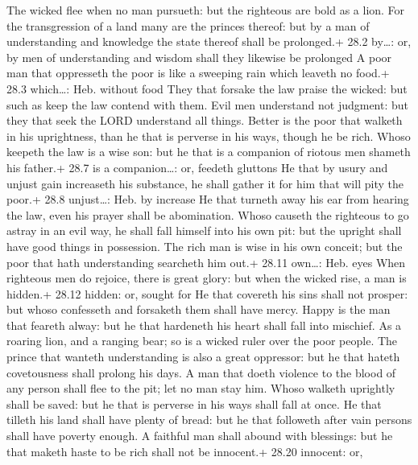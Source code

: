  The wicked flee when no man pursueth: but the righteous are
bold as a lion.  For the transgression of a land many are
the princes thereof: but by a man of understanding and knowledge the
state thereof shall be prolonged.+ 28.2 by\ldots: or, by men of
understanding and wisdom shall they likewise be prolonged  A
poor man that oppresseth the poor is like a sweeping rain which leaveth
no food.+ 28.3 which\ldots: Heb. without food  They that
forsake the law praise the wicked: but such as keep the law contend with
them.  Evil men understand not judgment: but they that seek
the LORD understand all things.  Better is the poor that
walketh in his uprightness, than he that is perverse in his ways, though
he be rich.  Whoso keepeth the law is a wise son: but he
that is a companion of riotous men shameth his father.+ 28.7 is a
companion\ldots: or, feedeth gluttons  He that by usury and
unjust gain increaseth his substance, he shall gather it for him that
will pity the poor.+ 28.8 unjust\ldots: Heb. by increase  He
that turneth away his ear from hearing the law, even his prayer shall be
abomination.  Whoso causeth the righteous to go astray in
an evil way, he shall fall himself into his own pit: but the upright
shall have good things in possession.  The rich man is wise
in his own conceit; but the poor that hath understanding searcheth him
out.+ 28.11 own\ldots: Heb. eyes  When righteous men do
rejoice, there is great glory: but when the wicked rise, a man is
hidden.+ 28.12 hidden: or, sought for  He that covereth his
sins shall not prosper: but whoso confesseth and forsaketh them shall
have mercy.  Happy is the man that feareth alway: but he
that hardeneth his heart shall fall into mischief.  As a
roaring lion, and a ranging bear; so is a wicked ruler over the poor
people.  The prince that wanteth understanding is also a
great oppressor: but he that hateth covetousness shall prolong his days.
 A man that doeth violence to the blood of any person shall
flee to the pit; let no man stay him.  Whoso walketh
uprightly shall be saved: but he that is perverse in his ways shall fall
at once.  He that tilleth his land shall have plenty of
bread: but he that followeth after vain persons shall have poverty
enough.  A faithful man shall abound with blessings: but he
that maketh haste to be rich shall not be innocent.+ 28.20 innocent: or,
